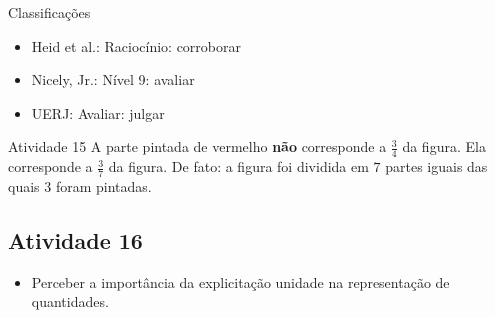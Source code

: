 \documentclass[oneside]{book}
\begin{document}
\begin{multicols}{2}
  Classificações
\begin{itemize} %
    \item       Heid et al.: Raciocínio: corroborar
    \item       Nicely, Jr.: Nível 9: avaliar
    \item       UERJ: Avaliar: julgar
\end{itemize} %


\begin{resposta*}{Atividade 15}
  A parte pintada de vermelho   {\bf não}   corresponde a   $\frac{3}{4}$   da figura. Ela corresponde a   $\frac{3}{7}$   da figura. De fato: a figura foi dividida em   $7$   partes iguais das quais   $3$   foram pintadas.
\end{resposta*}



\subsection{Atividade 16}



  \vspace{.1cm}
  
\begin{itemize} %
    \item       Perceber a importância da explicitação unidade na representação de quantidades.
\end{itemize} %


  \vspace{.1cm} 
  
  \vspace{.1cm}
  

\end{multicols}
\end{document}
